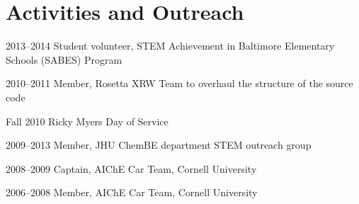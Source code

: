 \documentclass[12pt]{scrartcl}
\begin{document}
\section{\lsstyle Activities and Outreach}
\begin{CV}
\item[2013--2014] Student volunteer, STEM Achievement in Baltimore Elementary Schools (SABES) Program
\item[2010--2011] Member, Rosetta XRW Team to overhaul the structure of the source code
\item[Fall 2010] Ricky Myers Day of Service
\item[2009--2013] Member, JHU ChemBE department STEM outreach group
\item[2008--2009] Captain, AIChE Car Team, Cornell University
\item[2006--2008] Member, AIChE Car Team, Cornell University
\end{CV}
\end{document}
